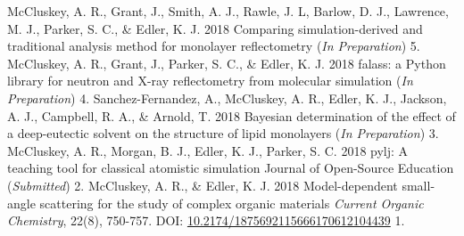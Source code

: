 \begin{cvpubys}
  \cvpuby
	{McCluskey, A. R., Grant, J., Smith, A. J., Rawle, J. L, Barlow, D. J., Lawrence, M. J., Parker, S. C., \& Edler, K. J.}
    {2018}
    {Comparing simulation-derived and traditional analysis method for monolayer reflectometry}
    {(\emph{In Preparation})}
    {5.}
  \cvpuby
    {McCluskey, A. R., Grant, J., Parker, S. C., \& Edler, K. J.}
    {2018}
    {falass: a Python library for neutron and X-ray reflectometry from molecular simulation}
    {(\emph{In Preparation})}
    {4.}
  \cvpuby
    {Sanchez-Fernandez, A., McCluskey, A. R., Edler, K. J., Jackson, A. J., Campbell, R. A., \& Arnold, T.}
    {2018}
    {Bayesian determination of the effect of a deep-eutectic solvent on the structure of lipid monolayers}
    {(\emph{In Preparation})}
    {3.}
  \cvpuby
	{McCluskey, A. R., Morgan, B. J., Edler, K. J., Parker, S. C.}
	{2018}
	{pylj: A teaching tool for classical atomistic simulation}
	{Journal of Open-Source Education (\emph{Submitted})}
	{2.}
  \cvpuby
    {McCluskey, A. R., \& Edler, K. J.}
    {2018}
    {Model-dependent small-angle scattering for the study of complex organic materials}
	{\emph{Current Organic Chemistry}, 22(8), 750-757. DOI: \href{http://www.doi.org/10.2174/1875692115666170612104439}{10.2174/1875692115666170612104439}}
    {1.}
\end{cvpubys}
